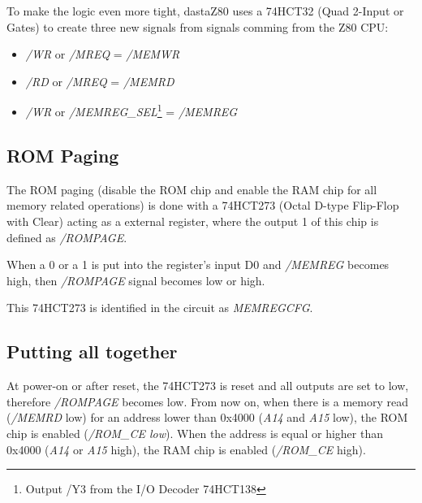 \documentclass[a4paper,11pt]{article}
\begin{document}
    To make the logic even more tight, dastaZ80 uses a 74HCT32 (Quad 2-Input or
    Gates) to create three new signals from signals comming from the Z80 CPU:

    \begin{itemize}
        \item \textit{/WR} or \textit{/MREQ} = \textit{/MEMWR}
        \item \textit{/RD} or \textit{/MREQ} = \textit{/MEMRD}
        \item \textit{/WR} or \textit{/MEMREG\_SEL}\footnote{Output /Y3 from the
        I/O Decoder 74HCT138} = \textit{/MEMREG}
    \end{itemize}

    \subsection{ROM Paging}

    The ROM paging (disable the ROM chip and enable the RAM chip for all memory
    related operations) is done with a 74HCT273 (Octal D-type Flip-Flop with
    Clear) acting as a external register, where the output 1 of this chip is 
    defined as \textit{/ROMPAGE}.

    When a 0 or a 1 is put into the register's input D0 and \textit{/MEMREG} 
    becomes high, then \textit{/ROMPAGE} signal becomes low or high.
    
    This 74HCT273 is identified in the circuit as \textit{MEMREGCFG}.
    
    \subsection{Putting all together}
    
    At power-on or after reset, the 74HCT273 is reset and all outputs are set to
    low, therefore \textit{/ROMPAGE} becomes low. From now on, when there is a
    memory read (\textit{/MEMRD} low) for an address lower than 0x4000
    (\textit{A14} and \textit{A15} low), the ROM chip is enabled
    (\textit{/ROM\_CE low}). When the address is equal or higher than 0x4000
    (\textit{A14} or \textit{A15} high), the RAM chip is enabled
    (\textit{/ROM\_CE} high).
\end{document}
